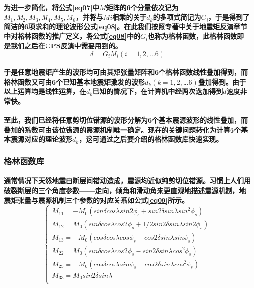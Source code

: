 \documentclass[a4paper,12pt,single,pdftex]{scrartcl}
\begin{document}
\label{ID_1164082214}\paragraph{为进一步简化，将公式\ref{eq07}中$M$矩阵的6个分量依次记为 $M_1,M_2,M_3,M_4,M_5,M_6$，并将与$Mi$相乘的关于$d_k$的多项式简记为$G_i$，于是得到了简洁的6项求和的理论波形公式\ref{eq08}。在此我们按照\citet{Stein2003}专著中关于地震矩反演章节中对格林函数的推广定义，将公式\ref{eq08}中的$G_i$也称为格林函数，此格林函数即是我们之后在CPS反演中需要用到的。
\begin{equation}
\label{eq08}
d=G_iM_i(i=1,2,...6)
\end{equation}}

\label{ID_1125175989}\paragraph{于是任意地震矩产生的波形均可由其矩张量矩阵和6个格林函数线性叠加得到，而格林函数又可由6个已知基本地震矩激发的波形$d_k(k=1,2,...6)$叠加得到。由于以上运算均是线性运算，在$d_k$已知的情况下，在计算机中经两次迭加得到$d$速度非常快。}

\label{ID_1890175740}\paragraph{至此，我们已经将任意剪切位错源的波形分解为6个基本震源波形的线性叠加，而叠加的系数可由该位错源的震源机制唯一确定。现在的关键问题转化为计算6个基本震源对应的理论波形$d_k$，这可通过之后要介绍的格林函数库快速实现。}

\label{ID_1740220633}\subsubsection{格林函数库}

\label{ID_100364337}\paragraph{通常情况下天然地震由断层间错动造成，震源均近似纯剪切位错源。习惯上人们用破裂断层的三个角度参数——走向，倾角和滑动角来更直观地描述震源机制，地震矩张量与震源机制三个参数的对应关系如公式\ref{eq09}所示\citep{Aki1980}。
\begin{equation}
\label{eq09}
\left\{
    \begin{array}{l}
    M_{11}=-M_0(sin{\delta}cos{\lambda}sin{2\phi_s}+sin{2\delta}sin{\lambda}sin^2{\phi_s})\\
    M_{12}=M_0(sin{\delta}cos{\lambda}cos{2\phi_s}+1/2sin{2\delta}sin{\lambda}sin{2\phi_s})\\
    M_{13}=-M_0(cos{\delta}cos{\lambda}cos{\phi_s}+cos{2\delta}sin{\lambda}sin{\phi_s})\\
    M_{22}=M_0(sin{\delta}cos{\lambda}cos{2\phi_s}-sin{2\delta}sin{\lambda}cos^2{\phi_s})\\
    M_{23}=-M_0(cos{\delta}cos{\lambda}sin{\phi_s}-cos{2\delta}sin{\lambda}cos^2{\phi_s})\\
    M_{33}=M_0sin{2\delta}sin{\lambda}\\
    \end{array}
\right.
\end{equation}}
\end{document}
